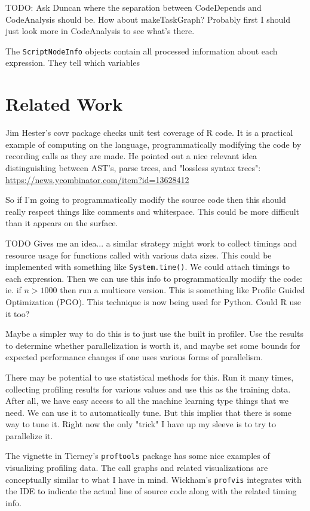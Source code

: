 \documentclass[12pt]{article}
\begin{document}
TODO: Ask Duncan where the separation between CodeDepends and CodeAnalysis
should be. How about makeTaskGraph? Probably first I should just look more
in CodeAnalysis to see what's there.

The \texttt{ScriptNodeInfo} objects contain all processed information about
each expression. They tell which variables 

\section{Related Work}

Jim Hester's covr package \cite{R-covr} checks unit test coverage of R
code. It is a practical example of computing on the language,
programmatically modifying the code by recording calls as they are made.
He pointed out a nice relevant idea distinguishing between AST's, parse
trees, and "lossless syntax trees":
\url{https://news.ycombinator.com/item?id=13628412}

So if I'm going to programmatically modify the source code then this should really
respect things like comments and whitespace. This could be more difficult
than it appears on the surface.

TODO Gives me an idea... a similar strategy might work to collect timings and
resource usage for functions called with various data sizes. This could be
implemented with something like \texttt{System.time()}. We could
attach timings to each expression. Then we can
use this info to programmatically modify the code: ie. if $n > 1000$ then
run a multicore version. This is something like Profile Guided Optimization
(PGO). This technique is now being used for Python. Could R use it too?

Maybe a simpler way to do this is to just use the built in profiler. Use
the results to determine whether parallelization is worth it, and maybe set
some bounds for expected performance changes if one uses various forms of
parallelism. 

There may be potential to use statistical methods for this.
Run it many times, collecting profiling results for various values and use
this as the training data. After all, we have easy access to all the
machine learning type things that we need. We can use it to automatically
tune. But this implies that there is some way to tune it. Right now the
only "trick" I have up my sleeve is to try to parallelize it.

The vignette in Tierney's \texttt{proftools} package has some nice examples
of visualizing profiling data. The call graphs and related visualizations
are conceptually similar to what I have in mind.
Wickham's \texttt{profvis} integrates with the IDE to indicate the actual
line of source code along with the related timing info.
\end{document}
